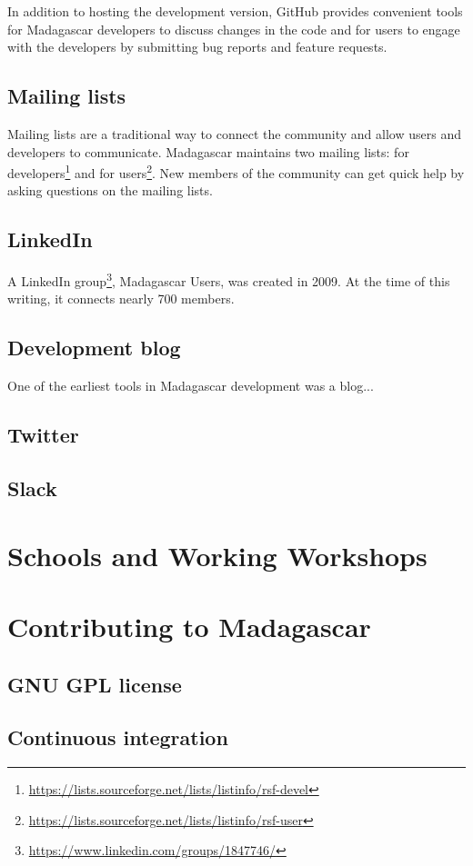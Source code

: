 In addition to hosting the development version, GitHub provides
convenient tools for Madagascar developers to discuss changes in the
code and for users to engage with the developers by submitting bug
reports and feature requests. 

\subsection{Mailing lists}

Mailing lists are a traditional way to connect the community and allow
users and developers to communicate. Madagascar maintains two mailing
lists: for
developers\footnote{\url{https://lists.sourceforge.net/lists/listinfo/rsf-devel}}
and for
users\footnote{\url{https://lists.sourceforge.net/lists/listinfo/rsf-user}}. New
members of the community can get quick help by asking questions on the
mailing lists.

\subsection{LinkedIn}

A LinkedIn
group\footnote{\url{https://www.linkedin.com/groups/1847746/}},
Madagascar Users, was created in 2009. At the time of this writing, it
connects nearly 700 members.

\subsection{Development blog}

One of the earliest tools in Madagascar development was a blog...

\subsection{Twitter}

\subsection{Slack}

\section{Schools and Working Workshops}

\section{Contributing to Madagascar}

\subsection{GNU GPL license}

\subsection{Continuous integration}

